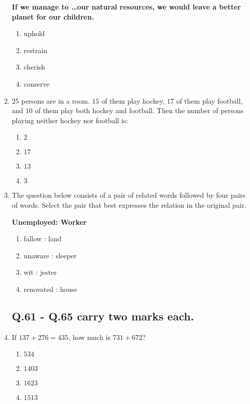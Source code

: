 \documentclass[journal,12pt,twocolumn]{IEEEtran}
\theoremstyle{remark}
\begin{document}
\begin{enumerate}[start=53]
   \textbf{ If we manage to \dots  our natural resources, we would leave a better planet for our children.}

    \begin{enumerate}
        \item uphold
        \item restrain
        \item cherish
        \item conserve
    \end{enumerate}

    \item $25$ persons are in a room. $15$ of them play hockey, $17$ of them play football, and $10$ of them play both hockey and football. Then the number of persons playing neither hockey nor football is:

    \begin{enumerate}
        \item $2$
        \item $17$
        \item $13$
        \item $3$
    \end{enumerate}

    \item The question below consists of a pair of related words followed by four pairs of words. Select the pair that best expresses the relation in the original pair.

    \textbf{Unemployed: Worker}

    \begin{enumerate}
        \item fallow : land
        \item unaware : sleeper
        \item wit : jester
        \item renovated : house
    \end{enumerate}


    \subsection{ Q.61 - Q.65 carry two marks each.}


\item  If $137 + 276 = 435$, how much is $731 + 672$?

    \begin{enumerate}
        \item $534$
        \item $1403$
        \item $1623$
        \item $1513$
    \end{enumerate}






\end{enumerate}
\end{document}
